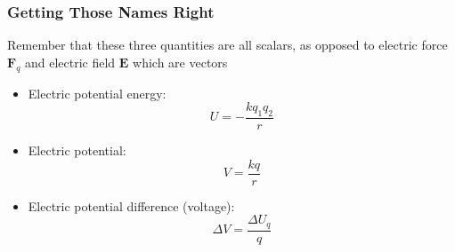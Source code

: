 \documentclass[12pt,aspectratio=169]{beamer}
\newcommand{\mb}[1]{\mathbf{#1}}
\begin{document}
\begin{frame}
  \frametitle{Getting Those Names Right}
  Remember that these three quantities are all scalars, as opposed to electric
  force $\mb{F}_q$ and electric field $\mb{E}$ which are vectors

  \vspace{.1in}
  \begin{itemize}
  \item Electric potential energy:
    \begin{displaymath}
      U=-\frac{kq_1q_2}{r}
    \end{displaymath}
  \item Electric potential:
    \begin{displaymath}
      V=\frac{kq}{r}
    \end{displaymath}
  \item Electric potential difference (voltage):
    \begin{displaymath}
      \Delta V=\frac{\Delta U_q}{q}
    \end{displaymath}
  \end{itemize}
\end{frame}
\end{document}
